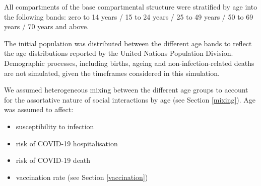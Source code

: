 All compartments of the base compartmental structure were stratified by age into the following bands:
zero to 14 years / 15 to 24 years / 25 to 49 years / 50 to 69 years / 70 years and above.

The initial population was distributed between the different age bands to reflect the age distributions reported by the United Nations Population Division. Demographic processes, including births, ageing and non-infection-related deaths are not simulated, given the timeframes considered in this simulation.

We assumed heterogeneous mixing between the different age groups to account for the assortative nature of social interactions by age (see Section \ref{mixing}).
Age was assumed to affect:
\begin{itemize}
    \item susceptibility to infection
    \item risk of COVID-19 hospitalisation
    \item risk of COVID-19 death
    \item vaccination rate (see Section \ref{vaccination})
\end{itemize}